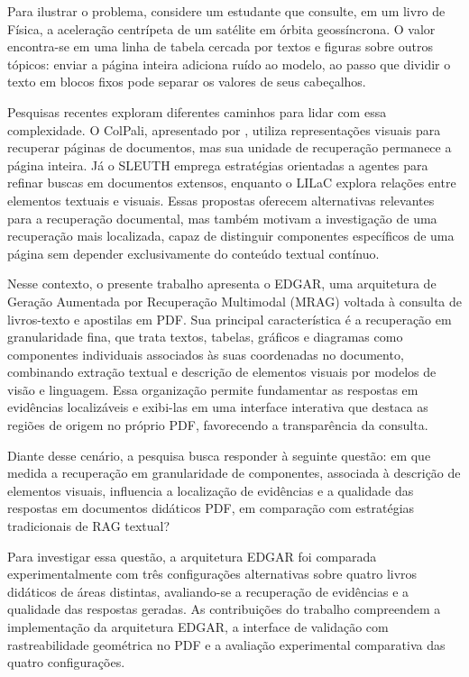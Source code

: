 Para ilustrar o problema, considere um estudante que consulte, em um livro de Física, a aceleração centrípeta de um satélite em órbita geossíncrona. O valor encontra-se em uma linha de tabela cercada por textos e figuras sobre outros tópicos: enviar a página inteira adiciona ruído ao modelo, ao passo que dividir o texto em blocos fixos pode separar os valores de seus cabeçalhos.

Pesquisas recentes exploram diferentes caminhos para lidar com essa complexidade. O ColPali, apresentado por , utiliza representações visuais para recuperar páginas de documentos, mas sua unidade de recuperação permanece a página inteira. Já o SLEUTH  emprega estratégias orientadas a agentes para refinar buscas em documentos extensos, enquanto o LILaC  explora relações entre elementos textuais e visuais. Essas propostas oferecem alternativas relevantes para a recuperação documental, mas também motivam a investigação de uma recuperação mais localizada, capaz de distinguir componentes específicos de uma página sem depender exclusivamente do conteúdo textual contínuo.

Nesse contexto, o presente trabalho apresenta o EDGAR, uma arquitetura de Geração Aumentada por Recuperação Multimodal (MRAG) voltada à consulta de livros-texto e apostilas em PDF. Sua principal característica é a recuperação em granularidade fina, que trata textos, tabelas, gráficos e diagramas como componentes individuais associados às suas coordenadas no documento, combinando extração textual e descrição de elementos visuais por modelos de visão e linguagem. Essa organização permite fundamentar as respostas em evidências localizáveis e exibi-las em uma interface interativa que destaca as regiões de origem no próprio PDF, favorecendo a transparência da consulta.

Diante desse cenário, a pesquisa busca responder à seguinte questão: em que medida a recuperação em granularidade de componentes, associada à descrição de elementos visuais, influencia a localização de evidências e a qualidade das respostas em documentos didáticos PDF, em comparação com estratégias tradicionais de RAG textual?

Para investigar essa questão, a arquitetura EDGAR foi comparada experimentalmente com três configurações alternativas sobre quatro livros didáticos de áreas distintas, avaliando-se a recuperação de evidências e a qualidade das respostas geradas. As contribuições do trabalho compreendem a implementação da arquitetura EDGAR, a interface de validação com rastreabilidade geométrica no PDF e a avaliação experimental comparativa das quatro configurações.

